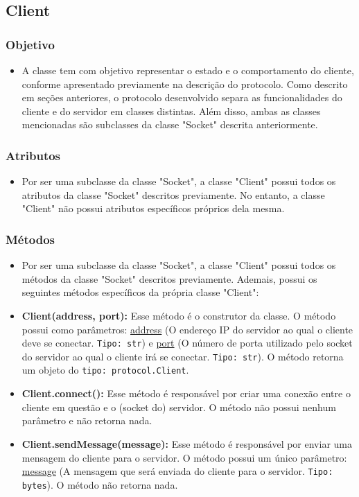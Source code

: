 \documentclass[10pt]{article}
\begin{document}
\begin{itemize}
    \subsection{\Large Client}
        \subsubsection{\large Objetivo}
            \begin{itemize}
            \item A classe tem com objetivo representar o estado e o comportamento do cliente, conforme apresentado previamente na descrição do protocolo. Como descrito em seções anteriores, o protocolo desenvolvido separa as funcionalidades do cliente e do servidor em classes distintas. Além disso, ambas as classes mencionadas são subclasses da classe "Socket" descrita anteriormente.
            \end{itemize}
        \subsubsection{\large Atributos}
            \begin{itemize}
            \item Por ser uma subclasse da classe "Socket", a classe "Client" possui todos os atributos da classe "Socket" descritos previamente. No entanto, a classe "Client" não possui atributos específicos próprios dela mesma.
            \end{itemize}
        \subsubsection{\large Métodos}
            \begin{itemize}
            \item Por ser uma subclasse da classe "Socket", a classe "Client" possui todos os métodos da classe "Socket" descritos previamente. Ademais, possui os seguintes métodos específicos da própria classe "Client":
            \item \textbf{Client(address, port):} Esse método é o construtor da classe. O método possui como parâmetros: \underline{address} (O endereço IP do servidor ao qual o cliente deve se conectar. \texttt{Tipo: str}) e \underline{port} (O número de porta utilizado pelo socket do servidor ao qual o cliente irá se conectar. \texttt{Tipo: str}).  O método retorna um objeto do \texttt{tipo: protocol.Client}.
            \item \textbf{Client.connect():} Esse método é responsável por criar uma conexão entre o cliente em questão e o (socket do) servidor. O método não possui nenhum parâmetro e não retorna nada.
            \item \textbf{Client.sendMessage(message):} Esse método é responsável por enviar uma mensagem do cliente para o servidor. O método possui um único parâmetro: \underline{message} (A mensagem que será enviada do cliente para o servidor. \texttt{Tipo: bytes}). O método não retorna nada.
            \end{itemize}
        

\end{itemize}
\end{document}
